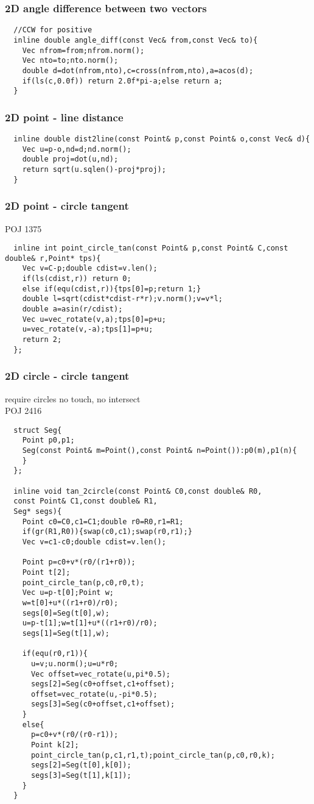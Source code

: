 \documentclass[a4paper]{article}
\begin{document}
\subsubsection{2D angle difference between two vectors}
\begin{lstlisting}
  //CCW for positive
  inline double angle_diff(const Vec& from,const Vec& to){
    Vec nfrom=from;nfrom.norm();
    Vec nto=to;nto.norm();
    double d=dot(nfrom,nto),c=cross(nfrom,nto),a=acos(d);
    if(ls(c,0.0f)) return 2.0f*pi-a;else return a;
  }
\end{lstlisting}
\subsubsection{2D point - line distance}
\begin{lstlisting}
  inline double dist2line(const Point& p,const Point& o,const Vec& d){
    Vec u=p-o,nd=d;nd.norm();
    double proj=dot(u,nd);
    return sqrt(u.sqlen()-proj*proj);
  }
\end{lstlisting}
\subsubsection{2D point - circle tangent}
POJ 1375
\begin{lstlisting}
  inline int point_circle_tan(const Point& p,const Point& C,const double& r,Point* tps){
    Vec v=C-p;double cdist=v.len();
    if(ls(cdist,r)) return 0;
    else if(equ(cdist,r)){tps[0]=p;return 1;}
    double l=sqrt(cdist*cdist-r*r);v.norm();v=v*l;
    double a=asin(r/cdist);
    Vec u=vec_rotate(v,a);tps[0]=p+u;
    u=vec_rotate(v,-a);tps[1]=p+u;
    return 2;
  };
\end{lstlisting}
\subsubsection{2D circle - circle tangent}
require circles no touch, no intersect \\
POJ 2416
\begin{lstlisting}
  struct Seg{
    Point p0,p1;
    Seg(const Point& m=Point(),const Point& n=Point()):p0(m),p1(n){
    }
  };

  inline void tan_2circle(const Point& C0,const double& R0,
  const Point& C1,const double& R1,
  Seg* segs){
    Point c0=C0,c1=C1;double r0=R0,r1=R1;
    if(gr(R1,R0)){swap(c0,c1);swap(r0,r1);}
    Vec v=c1-c0;double cdist=v.len();

    Point p=c0+v*(r0/(r1+r0));
    Point t[2];
    point_circle_tan(p,c0,r0,t);
    Vec u=p-t[0];Point w;
    w=t[0]+u*((r1+r0)/r0);
    segs[0]=Seg(t[0],w);
    u=p-t[1];w=t[1]+u*((r1+r0)/r0);
    segs[1]=Seg(t[1],w);

    if(equ(r0,r1)){
      u=v;u.norm();u=u*r0;
      Vec offset=vec_rotate(u,pi*0.5);
      segs[2]=Seg(c0+offset,c1+offset);
      offset=vec_rotate(u,-pi*0.5);
      segs[3]=Seg(c0+offset,c1+offset);
    }
    else{
      p=c0+v*(r0/(r0-r1));
      Point k[2];
      point_circle_tan(p,c1,r1,t);point_circle_tan(p,c0,r0,k);
      segs[2]=Seg(t[0],k[0]);
      segs[3]=Seg(t[1],k[1]);
    }
  }
\end{lstlisting}
\end{document}
